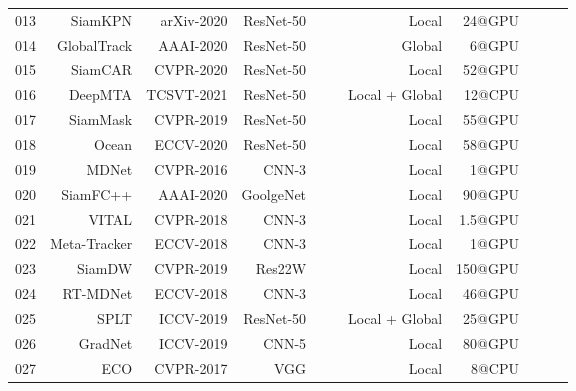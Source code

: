 \documentclass[final]{cvpr}
\begin{document}
\begin{table*}[!htp]
\begin{tabular}{rrrrccrrccc}
013			&SiamKPN		 \cite{li2020siamKPN}							&arXiv-2020    	&ResNet-50     	&\xmark     			&\cmark    	&Local    		 		&24@GPU    	&		 	\\
014			&GlobalTrack	 \cite{huang2019globaltrack}				&AAAI-2020    	&ResNet-50     	&\xmark     			&\cmark    	&Global    		 	&6@GPU    	 	&		 	\\
015			&SiamCAR		 \cite{guo2020siamcar}						&CVPR-2020    	&ResNet-50     	&\xmark     			&\cmark    	&Local    		 		&52@GPU    	&		 	\\
016			&DeepMTA		\cite{deepMTA}									&TCSVT-2021    	&ResNet-50     	&\cmark     			&\cmark    	&Local + Global    	&12@CPU   				&		 	\\
017			&SiamMask	 	 \cite{wang2019fast}							&CVPR-2019    	&ResNet-50     	&\xmark     			&\cmark    	&Local    		 		&55@GPU    	 			&		 	\\
018			&Ocean		 	  \cite{zhang2020ocean}						&ECCV-2020    	&ResNet-50     	&\xmark     			&\cmark    	&Local    		 		&58@GPU    	 			&		 	\\
019			&MDNet		 	  \cite{Nam2015Learning}					&CVPR-2016    	&CNN-3     			&\cmark     			&\cmark    	&Local    		 		&1@GPU    	 				&		 	\\
020			&SiamFC++	  	  \cite{xu2020siamfc++}						&AAAI-2020    	&GoolgeNet     	&\cmark     			&\cmark    	&Local    		 		&90@GPU    	 			&		 	\\
021			&VITAL			  \cite{SongYiBing_2018_CVPR}			&CVPR-2018    	&CNN-3     			&\cmark     			&\cmark    	&Local    		 		&1.5@GPU    	 			&		 	\\
022			&Meta-Tracker \cite{Park_2018_ECCV}						&ECCV-2018   	&CNN-3     			&\cmark     			&\cmark    	&Local    		 		&1@GPU    	 				&		 	\\
023			&SiamDW		 \cite{zhipeng2019deeper}					&CVPR-2019    	&Res22W     		&\xmark     			&\cmark    	&Local    		 		&150@GPU   	 			&		 	\\
024			&RT-MDNet	 	\cite{Jung_2018_ECCV}						&ECCV-2018    	&CNN-3     			&\cmark     			&\cmark    	&Local    		 		&46@GPU    	 			&		 	\\
025			&SPLT			 	\cite{yan2019skimming}						&ICCV-2019    	&ResNet-50     	&\xmark     			&\cmark    	&Local + Global  &25@GPU    	 			&		 	\\
026			&GradNet		 \cite{Li_2019_ICCV}							&ICCV-2019    	&CNN-5     			&\cmark     			&\cmark    	&Local    		 		&80@GPU   				&		 	\\
027			&ECO				 \cite{Danelljan2016ECO}					&CVPR-2017    	&VGG     			&\cmark     			&\xmark    	&Local    		 		&8@CPU    	 				&		 	\\

\end{tabular}
\end{table*}
\end{document}
